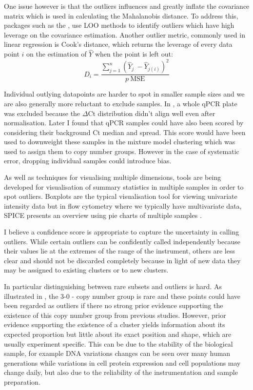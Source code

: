 One issue however is that the outliers influences and greatly inflate the covariance matrix which is used in calculating the Mahalanobis distance.
To address this, packages such as the , use \gls{LOO} methods to identify outliers which have high leverage on the covariance estimation.
Another outlier metric, commonly used in linear regression is Cook's distance, which returns the leverage of every data point $i$  on the estimation of $\hat Y$ when the point is left out:
\[
D_i = \frac{ \sum_{j=1}^n (\hat Y_j\ - \hat Y_{j(i)})^2 }{p \ \mathrm{MSE}}
\]

Individual outlying datapoints are harder to spot in smaller sample sizes and we are also generally more reluctant to exclude samples.
In , a whole qPCR plate was excluded because the $\Delta$Ct distribution didn’t align well even after normalisation.
Later I found that qPCR samples could have also been scored by considering their background Ct median and spread.
This score would have been used to downweight these samples in the mixture model clustering which was used to assign them to copy number groups.  
However in the case of systematic error, dropping individual samples could introduce bias.

As well as techniques for visualising multiple dimensions, tools are being developed for visualisation of summary statistics in multiple samples in order to spot outliers.
Boxplots are the typical visualisation tool for viewing univariate intensity data but in flow cytometry where we typically have multivariate data,
\gls{SPICE} presents an overview using pie charts of multiple samples \citep{Roederer:2011hy}.

I believe a confidence score is appropriate to capture the uncertainty in calling outliers.
While certain outliers can be confidently called independently because their values lie at the extremes of the range of the instrument, others are less clear and should not be discarded completely because in light of new data they may be assigned to existing clusters or to new clusters.

In particular distinguishing between rare subsets and outliers is hard.
As illustrated in , the 3-0 - copy number group is rare and these points could have been regarded as outliers if there no strong prior evidence supporting the existence of this copy number group from previous studies.
However, prior evidence supporting the existence of a cluster yields information about its expected proportion but little about its exact position and shape, which are usually experiment specific.
This can be due to the stability of the biological sample,  for example DNA variations changes can be seen over many human generations while variations in cell protein expression and cell populations may change daily, but also due to the reliability of the instrumentation and sample preparation.

